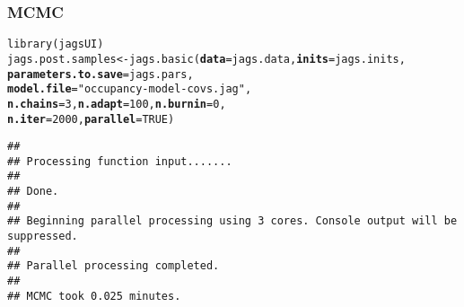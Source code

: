 \documentclass[color=usenames,dvipsnames]{beamer}\usepackage[]{graphicx}\usepackage[]{xcolor}
\makeatletter
\newcommand{\hlnum}[1]{\textcolor[rgb]{0.69,0.494,0}{#1}}%
\newcommand{\hlsng}[1]{\textcolor[rgb]{0.749,0.012,0.012}{#1}}%
\newcommand{\hldef}[1]{\textcolor[rgb]{0,0,0}{#1}}%
\newcommand{\hlkwb}[1]{\textcolor[rgb]{0,0.341,0.682}{#1}}%
\newcommand{\hlkwc}[1]{\textcolor[rgb]{0,0,0}{\textbf{#1}}}%
\newcommand{\hlkwd}[1]{\textcolor[rgb]{0.004,0.004,0.506}{#1}}%
\newenvironment{kframe}{%
 \def\at@end@of@kframe{}%
 \ifinner\ifhmode%
  \def\at@end@of@kframe{\end{minipage}}%
  \begin{minipage}{\columnwidth}%
 \fi\fi%
 \def\FrameCommand##1{\hskip\@totalleftmargin \hskip-\fboxsep
 \colorbox{shadecolor}{##1}\hskip-\fboxsep
     \hskip-\linewidth \hskip-\@totalleftmargin \hskip\columnwidth}%
 \MakeFramed {\advance\hsize-\width
   \@totalleftmargin\z@ \linewidth\hsize
   \@setminipage}}%
 {\par\unskip\endMakeFramed%
 \at@end@of@kframe}
\newenvironment{knitrout}{}{} %
\makeatother
\begin{document}
\begin{frame}[fragile]
  \frametitle{MCMC}
  \small
\begin{knitrout}\scriptsize
{}\color{fgcolor}\begin{kframe}
\begin{alltt}
\hlkwd{library}\hldef{(jagsUI)}
\hldef{jags.post.samples} \hlkwb{<-} \hlkwd{jags.basic}\hldef{(}\hlkwc{data}\hldef{=jags.data,} \hlkwc{inits}\hldef{=jags.inits,}
                                \hlkwc{parameters.to.save}\hldef{=jags.pars,}
                                \hlkwc{model.file}\hldef{=}\hlsng{"occupancy-model-covs.jag"}\hldef{,}
                                \hlkwc{n.chains}\hldef{=}\hlnum{3}\hldef{,} \hlkwc{n.adapt}\hldef{=}\hlnum{100}\hldef{,} \hlkwc{n.burnin}\hldef{=}\hlnum{0}\hldef{,}
                                \hlkwc{n.iter}\hldef{=}\hlnum{2000}\hldef{,} \hlkwc{parallel}\hldef{=}\hlnum{TRUE}\hldef{)}
\end{alltt}
\begin{verbatim}
## 
## Processing function input....... 
## 
## Done. 
##  
## Beginning parallel processing using 3 cores. Console output will be suppressed.
## 
## Parallel processing completed.
## 
## MCMC took 0.025 minutes.
\end{verbatim}
\end{kframe}
\end{knitrout}
\end{frame}
\end{document}
